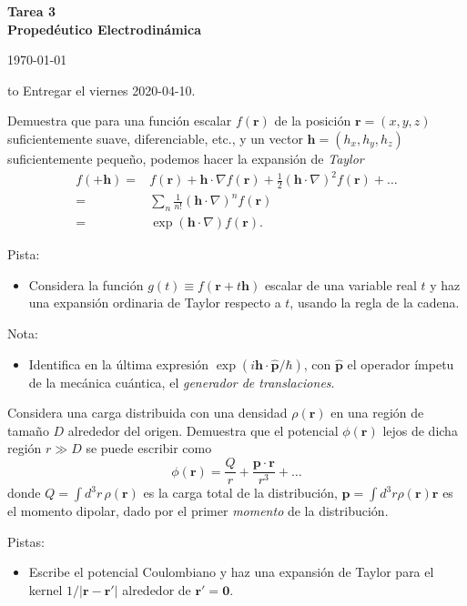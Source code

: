 \documentclass{exam}
\begin{document}
\begin{center}
\bf\large Tarea 3\\
Propedéutico Electrodinámica\\
\date{2020-03-10}
\today\\[20pt]
\end{center}
\hbox to \textwidth{Nombre: \enspace\hrulefill}
Entregar el viernes 2020-04-10.

\begin{questions}
  \question Demuestra que para una función escalar $f(\bm r)$ de la posición
  $\bm r=(x,y,z)$ suficientemente suave, diferenciable, etc., y un
  vector $\bm h=(h_x, h_y, h_z)$ suficientemente pequeño,
  podemos hacer la expansión de {\em Taylor}
  \begin{align*}
    f(\bm + \bm h)=&f(\bm r)+\bm h\cdot\nabla f(\bm r)+\frac{1}{2}(\bm
                     h\cdot\nabla)^2 f(\bm r)+\ldots\\
    =&\sum_n \frac{1}{n!}(\bm h\cdot\nabla)^n  f(\bm r)\\
    =& \exp(\bm h\cdot\nabla)f(\bm r).
  \end{align*}

  Pista:
  \begin{itemize}
  \item Considera la función $g(t)\equiv f(\bm r+t\bm h)$ escalar de
    una variable real $t$ y haz una expansión ordinaria de Taylor
    respecto a $t$, usando la regla de la cadena.
  \end{itemize}
  Nota:
  \begin{itemize}
  \item Identifica en la última expresión $\exp(i\bm
    h\cdot\hat{\bm p}/\hbar)$, con $\hat{\bm p}$ el operador ímpetu de
    la mecánica cuántica, el {\em generador de translaciones}.
  \end{itemize}
  \question Considera una carga distribuida con una densidad $\rho(\bm
  r)$ en una región de tamaño $D$ alrededor del origen. Demuestra que
  el potencial $\phi(\bm r)$ lejos de dicha región $r\gg D$ se puede
  escribir como
  $$\phi(\bm r)=\frac{Q}{r} + \frac{\bm p\cdot\bm r}{r^3} +\ldots
  $$
  donde
  $Q=\int d^3r\,\rho(\bm r)$ es la carga total de la distribución,
  $\bm p=\int d^3r \rho(\bm r)\bm r$ es el momento dipolar, dado por
  el primer {\em momento} de la distribución.

  Pistas:
  \begin{itemize}
  \item Escribe el potencial Coulombiano y haz una expansión de Taylor
    para el kernel $1/|\bm r-\bm r'|$ alrededor de $\bm r'=\bm 0$.
  \end{itemize}


\end{questions}
\end{document}
